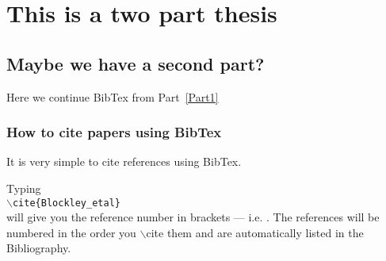 \chapter[This is definitely a two part thesis]{This is a two part thesis}

\section{Maybe we have a second part?}

Here we continue BibTex from  Part~\ref{Part1}

\subsection{How to cite papers using BibTex}

It is very simple to cite references using BibTex.

Typing\\ {\tt $\backslash$cite\{Blockley\_etal\}}\\ will give you the reference number in brackets --- i.e. \cite{Blockley_etal}.
The references will be numbered in the order you $\backslash$cite them and are automatically listed 	in the Bibliography.
